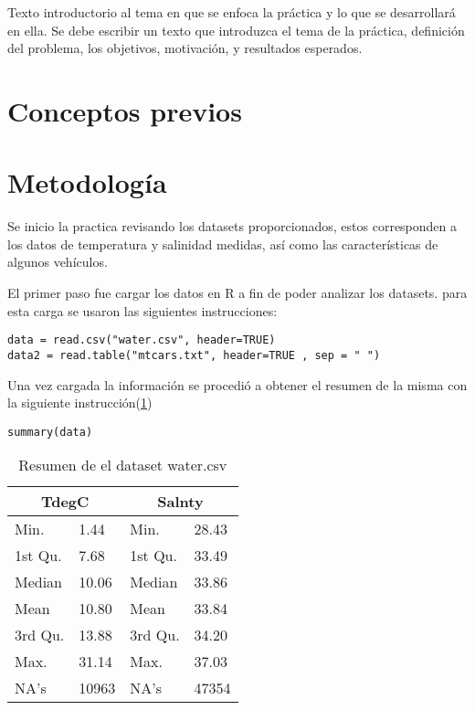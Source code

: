 \documentclass[sigconf]{acmart}
\begin{document}
Texto introductorio al tema en que se enfoca la pr{\'a}ctica y lo que se desarrollar{\'a} en ella. Se debe escribir un texto que introduzca el tema de la 
pr{\'a}ctica, definici{\'o}n del problema, los objetivos, motivaci{\'o}n,  y resultados esperados.

\section{Conceptos previos}


\section{Metodología}

Se inicio la practica revisando los datasets proporcionados, estos corresponden a los datos de temperatura y salinidad medidas, así como las características de algunos vehículos. 

El primer paso fue cargar los datos en R a fin de poder analizar los datasets. para esta carga se usaron las siguientes instrucciones:

\begin{lstlisting}[caption=lectura de los datos]
data = read.csv("water.csv", header=TRUE)
data2 = read.table("mtcars.txt", header=TRUE , sep = " ")
\end{lstlisting}

Una vez cargada la información se procedió a obtener el resumen de la misma con la siguiente instrucción(\ref{tab:Tabla1})

\begin{lstlisting}
summary(data)
\end{lstlisting}

\begin{table}
	\begin{tabularx}{\columnwidth}{|X|X|X|X|}
		\hline
		\multicolumn{2}{|c|}{ TdegC } & \multicolumn{2}{|c|}{ Salnty }  \\
		\hline
	Min. & 1.44  & Min. & 28.43 \\
		\hline
	1st Qu.& 7.68 &1st Qu.&33.49 \\
		\hline
	Median &10.06  & Median & 33.86   \\
		\hline
	Mean & 10.80 & Mean & 33.84\\
		\hline
	3rd Qu.&13.88 & 3rd Qu. & 34.20\\
		\hline
	Max. & 31.14 & Max.& 37.03  \\
		\hline
	NA's & 10963 & NA's  & 47354\\
		\hline
	\end{tabularx}
	\caption{\label{tab:Tabla1}Resumen de el dataset water.csv}
\end{table}
\end{document}
